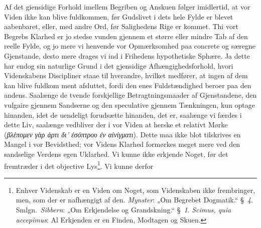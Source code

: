 \documentclass[12pt]{book}
\newcommand{\opage}[1]{\marginnote{\footnotesize\textit{[#1]}}}
\begin{document}
Af det giensidige Forhold imellem Begriben og Anskuen følger imidlertid, at vor
Viden ikke kan blive fuldkommen, før Gudslivet i dets hele Fylde er blevet
aabenbaret, eller, med andre Ord, før Salighedens Rige er kommet. Thi vort
Begrebs Klarhed er jo stedse vunden gjennem et større eller mindre Tab af den
reelle Fylde, og jo mere vi henvende vor Opmærksomhed paa concrete og særegne
Gjenstande, desto mere drages vi ind i Frihedens hypothetiske Sphære. Ja dette
har endog sin naturlige Grund i det gjensidige Afhængighedsforhold, hvori
Videnskabens Discipliner staae til hverandre, hvilket medfører, at ingen af dem
kan blive fuldkom\-%
\opage{48}\setcounter{footnote}{0}%
ment afsluttet, fordi den enes Fuldstændighed beroer paa den andens. Saalænge de
tvende forskjellige Betragtningsmaader af Gjenstandene, den vulgaire gjennem
Sandserne og den speculative gjennem Tænkningen, kun optage hinanden, idet de
uendeligt forudsætte hinanden, det er, saalænge vi færdes i dette Liv, saalænge
vedbliver der i vor Viden at herske et relativt Mørke
(\textit{βλέπομεν γὰρ ἀρτι δι' ἐσόπτρου ἐν αἰνίγματι}). Dette maa ikke blot
tilskrives en Mangel i vor Bevidsthed; vor Videns Klarhed formørkes meget mere
ved den sandselige Verdens egen Uklarhed. Vi kunne ikke erkjende Noget, før det
fremtræder i det objective Lys\footnote{Enhver Videnskab er en Viden om Noget,
som Videnskaben ikke frembringer, men, som der er nafhængigt af den.
\emph{Mynster}: „Om Begrebet Dogmatik.“ §~\textit{4}. Smlgn.\ \emph{Sibbern}:
„Om Erkjendelse og Grandskning.“ §~\textit{1}. \textit{Scimus, quia
accepimus}: Al Erkjenden er en Finden, Modtagen og Skuen.}. Vi kunne derfor
\end{document}
